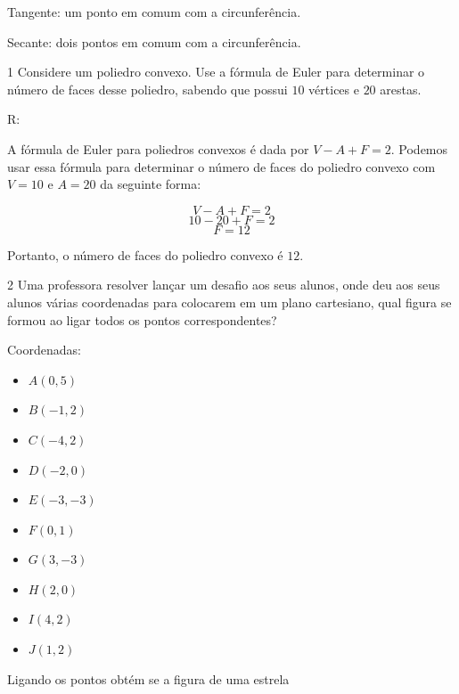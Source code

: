 Tangente: um ponto em comum com a circunferência.

Secante: dois pontos em comum com a circunferência.


\num{1}  Considere um poliedro convexo. Use a fórmula de Euler para determinar
o número de faces desse poliedro, sabendo que possui $10$ vértices e $20$
arestas.

R:

A fórmula de Euler para poliedros convexos é dada por $V - A + F = 2$.
Podemos usar essa fórmula para determinar o número de faces do poliedro
convexo com $V = 10$ e $A = 20$ da seguinte forma:



$$V - A + F = 2$$
$$10 - 20 + F = 2$$
$$F = 12$$


Portanto, o número de faces do poliedro convexo é $12$.

\num{2}  Uma professora resolver lançar um desafio aos seus alunos, onde deu
aos seus alunos várias coordenadas para colocarem em um plano
cartesiano, qual figura se formou ao ligar todos os pontos
correspondentes?

Coordenadas:

\begin{multicols}{3}\baselineskip 
\begin{itemize}
\item $A (0,5)$

\item $B (-1,2)$

\item $C (-4,2)$

\item $D (-2,0)$

\item $E (-3,-3)$

\item $F (0,1)$

\item $G (3,-3)$

\item $H (2,0)$

\item $I (4,2)$

\item $J (1,2)$
\end{itemize}
\end{multicols}

Ligando os pontos obtém se a figura de uma estrela

